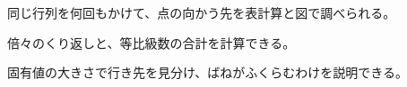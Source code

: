 \begin{furikaeri}
\begin{checklist}
\item 同じ行列を何回もかけて、点の向かう先を表計算と図で調べられる。
\item 倍々のくり返しと、等比級数の合計を計算できる。
\item 固有値の大きさで行き先を見分け、ばねがふくらむわけを説明できる。
\end{checklist}
\end{furikaeri}

